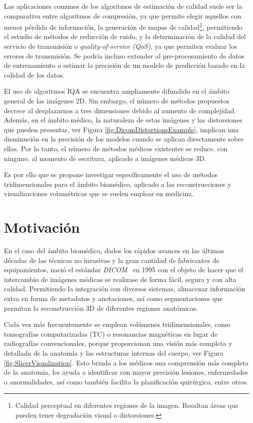 Las aplicaciones comunes de los algoritmos de estimación de calidad suele ser 
la comparativa entre algoritmos de compresión, ya que permite elegir aquellos con 
menor pérdida de información, la generación de mapas de calidad\footnote{
  Calidad perceptual en diferentes regiones de la imagen. Resaltan áreas que 
  pueden tener degradación visual o distorsiones.
},
permitiendo el estudio de métodos de reducción de ruido,
y la determinación de la calidad del servicio de transmisión o \emph{quality-of-service (QoS)},
ya que permiten evaluar los errores de transmisión\cite{VMAF, VMAFReproducibility}. Se podría incluso 
extender al pre-procesamiento de datos de entrenamiento o estimar la precisión 
de un modelo de predicción basado en la calidad de los datos\cite{ApplicationsOfIQA}.

El uso de algoritmos IQA se encuentra ampliamente difundido en el ámbito general de las imágenes 2D. 
Sin embargo, el número de métodos propuestos decrece al desplazarnos a tres dimensiones
debido al aumento de complejidad.
Además, en el ámbito médico, la naturaleza de estas imágenes y las distorsiones que pueden 
presentar, ver Figura \ref{fig:DicomDistortionsExample}, implican una disminución en 
la precisión de los modelos cuando se aplican directamente sobre ellas\cite{VisualMedicalQualityBook}.
Por lo tanto, el número de métodos médicos existentes se reduce, con ninguno, al 
momento de escritura, aplicado a imágenes médicas 3D. 

Es por ello que se propone investigar específicamente el uso de métodos tridimensionales
para el ámbito biomédico, aplicado a las reconstrucciones y visualizaciones volumétricas 
que se suelen emplear en medicina.

\section{Motivación}
 
En el caso del ámbito biomédico, dados los rápidos avances en las últimas décadas
de las técnicas no invasivas y la gran cantidad de fabricantes 
de equipamientos, nació el estándar \emph{DICOM}~\cite{Parisot1995} en 1995 
con el objeto de hacer que el intercambio de imágenes médicas se realizase de forma 
fácil, segura y con alta calidad. Permitiendo la integración con diversos sistemas, 
almacenar información extra en forma de metadatos y anotaciones, así como segmentaciones que permitan la reconstrucción 3D de diferentes regiones anatómicas.


Cada vez más frecuentemente se emplean volúmenes tridimensionales, como tomografías computarizadas (TC) o 
resonancias magnéticas en lugar de radiografías convencionales, porque 
proporcionan una visión más completa y detallada de la anatomía y las estructuras 
internas del cuerpo, ver Figura \ref{fig:SlicerVisualization}. 
Esto brinda a los médicos una comprensión más completa de la anatomía,
les ayuda a identificar con mayor precisión lesiones, enfermedades o anormalidades,
así como también facilita la planificación quirúrgica, entre otros\cite{3DImagingInMedicine, 3DImagingInMedicine2, ADAS3D}.
 
